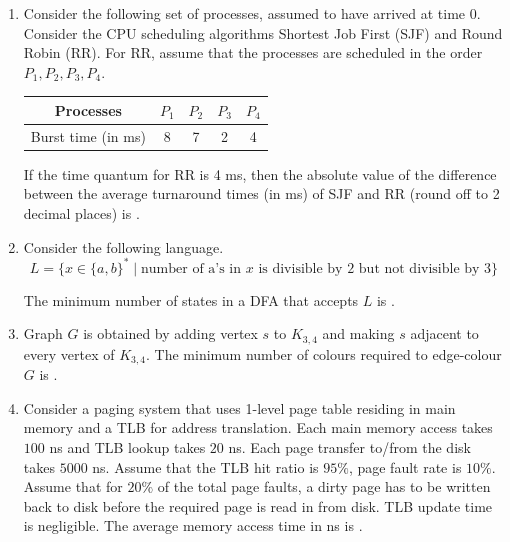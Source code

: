 \documentclass[journal,12pt,onecolumn]{IEEEtran}
\theoremstyle{remark}
\begin{document}
\begin{enumerate}
\item Consider the following set of processes, assumed to have arrived at time 0. 
Consider the CPU scheduling algorithms Shortest Job First (SJF) and Round Robin (RR). 
For RR, assume that the processes are scheduled in the order $P_1,P_2,P_3,P_4$.\\
\begin{center}
	\begin{tabular}{|c|c|c|c|c|}
		\hline
		Processes & $P_1$ & $P_2$ & $P_3$ & $P_4$ \\
		\hline
		Burst time (in ms) & 8 & 7 & 2 & 4 \\
		\hline
	\end{tabular}
\end{center}
If the time quantum for RR is 4 ms, then the absolute value of the difference between the average turnaround times (in ms) of SJF and RR (round off to 2 decimal places) is \underline{\hspace{2cm}}.  \hfill{}

\item Consider the following language.
\[
L = \{x \in \{a,b\}^* \mid \text{number of a's in $x$ is divisible by 2 but not divisible by 3}\}
\]

The minimum number of states in a DFA that accepts $L$ is \underline{\hspace{2cm}}.
\hfill{}\\
\item Graph $G$ is obtained by adding vertex $s$ to $K_{3,4}$ and making $s$ adjacent to every vertex of $K_{3,4}$.  
The minimum number of colours required to edge-colour $G$ is \underline{\hspace{2cm}}.  
\hfill{}\\

\item Consider a paging system that uses 1-level page table residing in main memory and a TLB for address translation. Each main memory access takes $100$ ns and TLB lookup takes $20$ ns. Each page transfer to/from the disk takes $5000$ ns. Assume that the TLB hit ratio is $95\%$, page fault rate is $10\%$. Assume that for $20\%$ of the total page faults, a dirty page has to be written back to disk before the required page is read in from disk. TLB update time is negligible. The average memory access time in ns  is \underline{\hspace{2cm}}.
\hfill{}\\
 

\end{enumerate}
\end{document}
